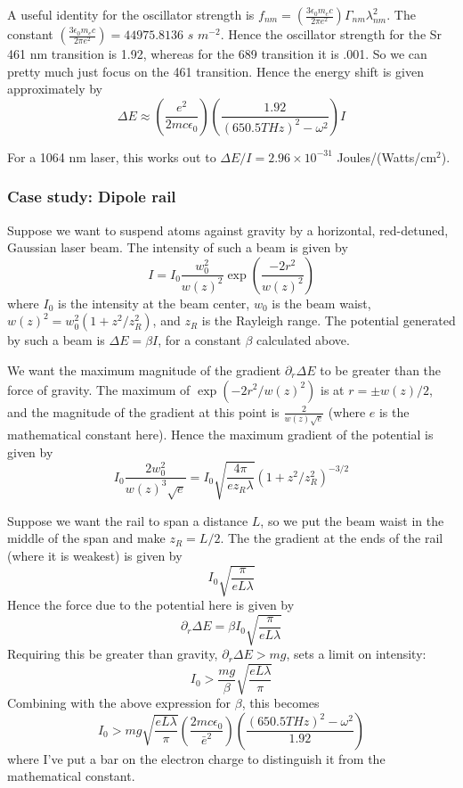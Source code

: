 \documentclass[aps,twocolumn,prb,floatfix,amsmath,amssymb,groupedaddress]{revtex4}
\begin{document}
A useful identity for the oscillator strength is $f_{nm} = \left(\frac{3\epsilon_0 m_e c}{2\pi e^2}\right) \Gamma_{nm} \lambda_{nm}^2$.  The constant $\left(\frac{3\epsilon_0 m_e c}{2\pi e^2}\right) = 44 975.8136$ $s$ $m^{-2}$.  Hence the oscillator strength for the Sr 461 nm transition is 1.92, whereas for the 689 transition it is .001.  So we can pretty much just focus on the 461 transition.  Hence the energy shift is given approximately by 
\[\Delta E \approx \left(\frac{e^2}{2mc\epsilon_0}\right) \left(\frac{1.92}{(650.5 THz)^2 - \omega^2}\right) I \]

For a 1064 nm laser, this works out to $\Delta E/I = 2.96 \times 10^{-31}$ Joules/(Watts/cm$^2$).

\subsubsection{Case study: Dipole rail}
Suppose we want to suspend atoms against gravity by a horizontal, red-detuned, Gaussian laser beam.  The intensity of such a beam is given by \[I = I_0 \frac{w_0^2}{w(z)^2} \exp\left(\frac{-2r^2}{w(z)^2}\right) \] where $I_0$ is the intensity at the beam center, $w_0$ is the beam waist, $w(z)^2 = w_0^2 \left(1 + z^2/z_R^2\right)$, and $z_R$ is the Rayleigh range.  The potential generated by such a beam is $\Delta E = \beta I$, for a constant $\beta$ calculated above.  

We want the maximum magnitude of the gradient $\partial_r \Delta E$ to be greater than the force of gravity.  The maximum of $\exp(-2r^2/w(z)^2)$ is at $r=\pm w(z)/2$, and the magnitude of the gradient at this point is $\frac{2}{w(z)\sqrt{e}}$ (where $e$ is the mathematical constant here).  Hence the maximum gradient of the potential is given by \[I_0 \frac{2w_0^2}{w(z)^3 \sqrt{e}} = I_0 \sqrt{\frac{4\pi}{e z_R \lambda}}\left(1+z^2/z_R^2\right)^{-3/2}\]

Suppose we want the rail to span a distance $L$, so we put the beam waist in the middle of the span and make $z_R = L/2$.  The the gradient at the ends of the rail (where it is weakest) is given by \[ I_0 \sqrt{\frac{\pi}{eL\lambda}}\]
Hence the force due to the potential here is given by \[\partial_r \Delta E = \beta I_0 \sqrt{\frac{\pi}{eL\lambda}}\]
Requiring this be greater than gravity, $\partial_r \Delta E > mg$, sets a limit on intensity:
\[I_0 > \frac{mg}{\beta} \sqrt{\frac{eL\lambda}{\pi}}\]
Combining with the above expression for $\beta$, this becomes
\[I_0 > mg \sqrt{\frac{eL\lambda}{\pi}} \left(\frac{2mc\epsilon_0}{\bar{e}^2}\right) \left(\frac{(650.5 THz)^2 - \omega^2}{1.92}\right) \]
where I've put a bar on the electron charge to distinguish it from the mathematical constant.
\end{document}
